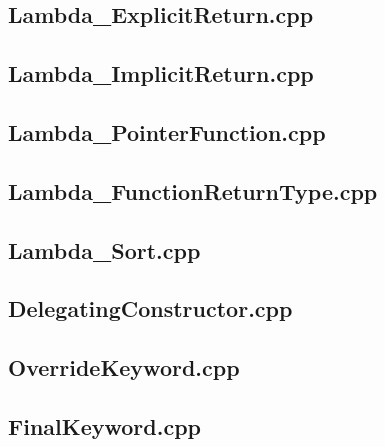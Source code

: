 \documentclass[11pt]{report}
\begin{document}
\begin{appendix}
\subsection{Lambda\_ExplicitReturn.cpp}
\label{Lambda_ExplicitReturn}


\subsection{Lambda\_ImplicitReturn.cpp}
\label{Lambda_ImplicitReturn}


\subsection{Lambda\_PointerFunction.cpp}
\label{Lambda_PointerFunction}


\subsection{Lambda\_FunctionReturnType.cpp}
\label{Lambda_FunctionReturnType}


\subsection{Lambda\_Sort.cpp}
\label{Lambda_Sort}


\subsection{DelegatingConstructor.cpp}
\label{DelegatingConstructor}


\subsection{OverrideKeyword.cpp}
\label{OverrideKeyword}


\subsection{FinalKeyword.cpp}
\label{FinalKeyword}



\end{appendix}
\end{document}
